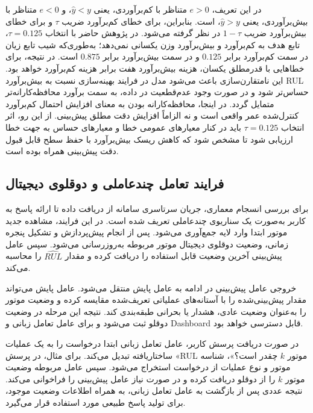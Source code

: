در این تعریف، 
$e>0$
 متناظر با کم‌برآوردی، یعنی
$\hat{y}<y$،
 و 
 $e<0$ 
 متناظر با بیش‌برآوردی، یعنی
$\hat{y}>y$، است. بنابراین، برای خطای کم‌برآورد ضریب $\tau$ و
برای خطای بیش‌برآورد ضریب $1-\tau$ در نظر گرفته می‌شود. در
پژوهش حاضر با انتخاب $\tau=0.125$، تابع هدف به کم‌برآورد و
بیش‌برآورد وزن یکسانی نمی‌دهد؛ به‌طوری‌که شیب تابع زیان در سمت
کم‌برآورد برابر $0.125$ و در سمت بیش‌برآورد برابر $0.875$ است.
در نتیجه، برای خطاهایی با قدرمطلق یکسان، هزینه بیش‌برآورد
هفت برابر هزینه کم‌برآورد خواهد بود. این نامتقارن‌سازی باعث
می‌شود مدل در فرایند بهینه‌سازی نسبت به بیش‌برآورد \gls{RUL}
حساس‌تر شود و در صورت وجود عدم‌قطعیت در داده، به سمت برآورد
محافظه‌کارانه‌تر متمایل گردد. در اینجا، محافظه‌کارانه بودن به
معنای افزایش احتمال کم‌برآورد کنترل‌شده عمر واقعی است و نه
الزاماً افزایش دقت مطلق پیش‌بینی. از این رو، اثر انتخاب
$\tau=0.125$
 باید در کنار معیارهای عمومی خطا و معیارهای حساس
به جهت خطا ارزیابی شود تا مشخص شود که کاهش ریسک بیش‌برآورد با
حفظ سطح قابل قبول دقت پیش‌بینی همراه بوده است.

\subsection{فرایند تعامل چندعاملی و دوقلوی دیجیتال}
\label{sec:e2e-scenario}

برای بررسی انسجام معماری، جریان سرتاسری سامانه از دریافت داده تا
ارائه پاسخ به کاربر به‌صورت یک سناریوی چندعاملی تعریف شده است.
در این فرایند، مشاهده جدید موتور ابتدا وارد لایه جمع‌آوری می‌شود.
پس از انجام پیش‌پردازش و تشکیل پنجره زمانی، وضعیت دوقلوی دیجیتال
موتور مربوطه به‌روزرسانی می‌شود. سپس عامل پیش‌بینی آخرین وضعیت
قابل استفاده را دریافت کرده و مقدار $\widehat{RUL}$ را محاسبه
می‌کند.

خروجی عامل پیش‌بینی در ادامه به عامل پایش منتقل می‌شود. عامل
پایش می‌تواند مقدار پیش‌بینی‌شده را با آستانه‌های عملیاتی تعریف‌شده
مقایسه کرده و وضعیت موتور را به‌عنوان وضعیت عادی، هشدار یا بحرانی
طبقه‌بندی کند. نتیجه این مرحله در وضعیت دوقلو ثبت می‌شود و برای
عامل تعامل زبانی و \gls{Dashboard} قابل دسترسی خواهد بود.

در صورت دریافت پرسش کاربر، عامل تعامل زبانی ابتدا درخواست را به
یک عملیات ساختاریافته تبدیل می‌کند. برای مثال، در پرسش
«\gls{RUL} موتور $k$ چقدر است؟»، شناسه موتور و نوع عملیات از
درخواست استخراج می‌شود. سپس عامل مربوطه وضعیت موتور $k$ را از
دوقلو دریافت کرده و در صورت نیاز عامل پیش‌بینی را فراخوانی
می‌کند. نتیجه عددی پس از بازگشت به عامل تعامل زبانی، به همراه
اطلاعات وضعیت موجود، برای تولید پاسخ طبیعی مورد استفاده قرار
می‌گیرد.


